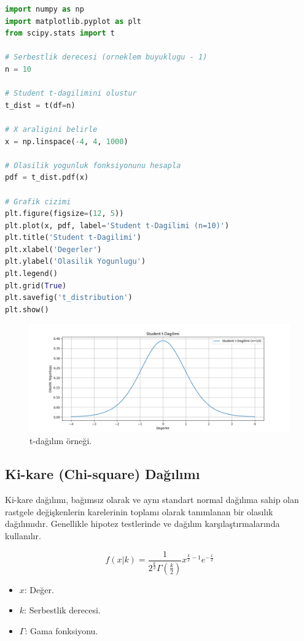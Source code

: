\begin{lstlisting}[language=Python]
import numpy as np
import matplotlib.pyplot as plt
from scipy.stats import t

# Serbestlik derecesi (orneklem buyuklugu - 1)
n = 10

# Student t-dagilimini olustur
t_dist = t(df=n)

# X araligini belirle
x = np.linspace(-4, 4, 1000)

# Olasilik yogunluk fonksiyonunu hesapla
pdf = t_dist.pdf(x)

# Grafik cizimi
plt.figure(figsize=(12, 5))
plt.plot(x, pdf, label='Student t-Dagilimi (n=10)')
plt.title('Student t-Dagilimi')
plt.xlabel('Degerler')
plt.ylabel('Olasilik Yogunlugu')
plt.legend()
plt.grid(True)
plt.savefig('t_distribution')
plt.show()
\end{lstlisting}

\newpage

\begin{figure}[h]
    \centering
    \includegraphics[width=1\textwidth]{images/t_distribution.png}
    \caption{t-dağılım örneği.}
    \label{fig:enter-label}
\end{figure}

\subsection{Ki-kare (Chi-square) Dağılımı}
Ki-kare dağılımı, bağımsız olarak ve aynı standart normal dağılıma sahip olan rastgele değişkenlerin karelerinin toplamı olarak tanımlanan bir olasılık dağılımıdır. Genellikle hipotez testlerinde ve dağılım karşılaştırmalarında kullanılır.

\[f(x|k) = \frac{1}{2^{\frac{k}{2}} \Gamma\left(\frac{k}{2}\right)} x^{\frac{k}{2} - 1} e^{-\frac{x}{2}}\]
\begin{itemize}
	\item $x$: Değer.
	\item $k$: Serbestlik derecesi.
	\item $\Gamma$: Gama fonksiyonu.
\end{itemize}


